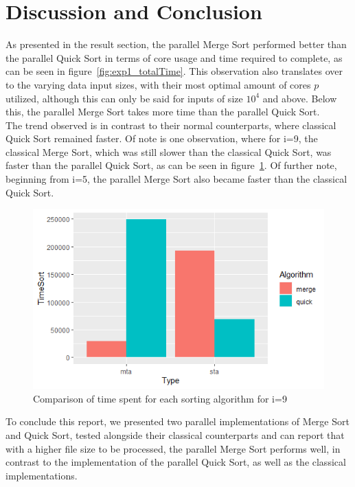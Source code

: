 \documentclass[twocolumn]{article}
\begin{document}
\section{Discussion and Conclusion}
As presented in the result section, the parallel Merge Sort performed better than the parallel Quick Sort in terms of core usage and time required to complete, as can be seen in figure~\ref{fig:exp1_totalTime}. This observation also translates over to the varying data input sizes, with their most optimal amount of cores $p$ utilized, although this can only be said for inputs of size $10^4$ and above. Below this, the parallel Merge Sort takes more time than the parallel Quick Sort.\\
The trend observed is in contrast to their normal counterparts, where classical Quick Sort remained faster. Of note is one observation, where for i=9, the classical Merge Sort, which was still slower than the classical Quick Sort, was faster than the parallel Quick Sort, as can be seen in figure~\ref{fig:exp2_i9}. Of further note, beginning from i=5, the parallel Merge Sort also became faster than the classical Quick Sort.

\begin{figure}[h]
	\includegraphics[scale=0.5]{./figures/exp2_comparison_i9_sort.png}
	\centering
	\caption{Comparison of time spent for each sorting algorithm for i=9}
	\label{fig:exp2_i9}
\end{figure}

To conclude this report, we presented two parallel implementations of Merge Sort and Quick Sort, tested alongside their classical counterparts and can report that with a higher file size to be processed, the parallel Merge Sort performs well, in contrast to the implementation of the parallel Quick Sort, as well as the classical implementations.
\end{document}
